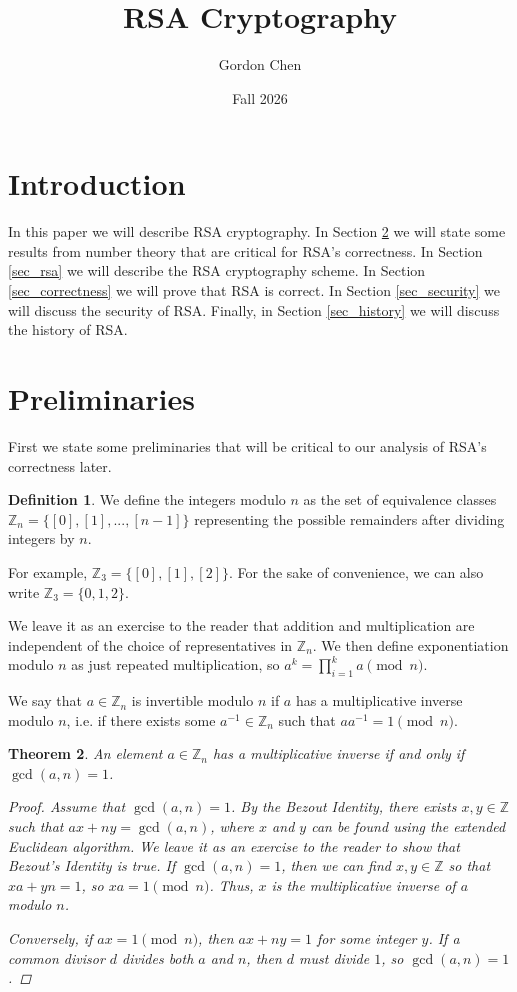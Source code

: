\documentclass[12pt, letterpaper]{article}
\title{RSA Cryptography}
\author{Gordon Chen}
\date{Fall 2026}
\newtheorem{thm}{Theorem}[section]
\theoremstyle{definition}
\newtheorem{defn}[thm]{Definition}
\begin{document}
\maketitle

\section{Introduction} \label{intro}
In this paper we will describe RSA cryptography.
In Section \ref{sec_prelim} we will state some results from number theory that are
critical for RSA's correctness.
In Section \ref{sec_rsa} we will describe the RSA cryptography scheme.
In Section \ref{sec_correctness} we will prove that RSA is correct.
In Section \ref{sec_security} we will discuss the security of RSA.
Finally, in Section \ref{sec_history} we will discuss the history of RSA.

\section{Preliminaries} \label{sec_prelim}
First we state some preliminaries that will be critical to our analysis of RSA's correctness later.

\begin{defn}
  We define the integers modulo $n$ as the set of equivalence classes
  $\mathbb{Z}_n = \{[0], [1], ..., [n-1]\}$
  representing the possible remainders after dividing integers by $n$.
\end{defn}

For example, $\mathbb{Z}_3 = \{[0], [1], [2]\}$. For the sake of convenience,
we can also write $\mathbb{Z}_3 = \{0, 1, 2\}$.

We leave it as an exercise to the reader that addition and multiplication are
independent of the choice of representatives in $\mathbb{Z}_n$.
We then define exponentiation modulo $n$ as just repeated multiplication, so
$a^k = \prod_{i=1}^k a \pmod n$.

We say that $a \in \mathbb{Z}_n$ is invertible modulo $n$ if $a$ has
a multiplicative inverse modulo $n$, i.e. if there exists some $a^{-1} \in \mathbb{Z}_n$
such that $a a^{-1} = 1 \pmod n$.

\begin{thm}
  An element $a \in \mathbb{Z}_n$ has a multiplicative inverse if and only if $\gcd(a, n) = 1$.

  \begin{proof}
    Assume that $\gcd(a, n) = 1$.
    By the Bezout Identity, there exists $x,y \in \mathbb{Z}$ such that
    $ax+ny=\gcd(a,n)$, where
    $x$ and $y$ can be found using the extended Euclidean algorithm.
    We leave it as an exercise to the reader to show that Bezout's Identity is true.
    If $\gcd(a,n) = 1$, then we can find $x,y \in \mathbb{Z}$ so
    that $x a + y n = 1$, so $x a = 1 \pmod n$.
    Thus, $x$ is the multiplicative inverse of $a$ modulo $n$.

    Conversely, if $ax = 1\pmod n$, then $ax+ny=1$ for some integer $y$.
    If a common divisor $d$ divides both $a$ and $n$, then $d$ must divide $1$, so
    $\gcd(a, n) = 1$ \cite{conrad_mod}.
  \end{proof}
\end{thm}
\end{document}
